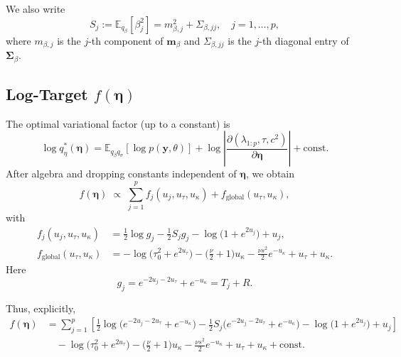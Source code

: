 \documentclass[11pt]{article}
\newcommand{\vect}[1]{\boldsymbol{#1}}
\newcommand{\mat}[1]{\mathbf{#1}}
\newcommand{\E}{\mathbb{E}}
\begin{document}
We also write
\begin{equation}
  S_j := \E_{q_\beta}[\beta_j^2]
       = m_{\beta,j}^2 + \Sigma_{\beta,jj},
  \quad j=1,\dots,p,
\end{equation}
where $m_{\beta,j}$ is the $j$-th component of $\vect{m}_\beta$ and $\Sigma_{\beta,jj}$ is the $j$-th diagonal entry of $\mat{\Sigma}_\beta$.

\subsection{Log-Target $f(\boldsymbol{\eta})$}

The optimal variational factor (up to a constant) is
\begin{equation}
  \log q_\eta^*(\vect{\eta})
  = \E_{q_\beta q_\sigma}[\log p(\vect{y},\theta)]
    + \log \left|\frac{\partial(\lambda_{1:p},\tau,c^2)}{\partial \vect{\eta}} \right|
    + \text{const}.
\end{equation}
After algebra and dropping constants independent of $\vect{\eta}$, we obtain
\begin{equation}
  f(\vect{\eta}) \;\propto\; \sum_{j=1}^p f_j(u_j,u_\tau,u_\kappa) 
  + f_{\mathrm{global}}(u_\tau,u_\kappa),
\end{equation}
with
\begin{align}
  f_j(u_j,u_\tau,u_\kappa)
  &=
  \frac12 \log g_j
  - \frac12 S_j g_j
  - \log\big(1+e^{2u_j}\big)
  + u_j, \label{eq:fj-def}\\[3pt]
  f_{\mathrm{global}}(u_\tau,u_\kappa)
  &=
  -\log\big(\tau_0^2 + e^{2u_\tau}\big)
  -\Big(\frac{\nu}{2}+1\Big)u_\kappa
  -\frac{\nu s^2}{2}e^{-u_\kappa}
  + u_\tau + u_\kappa. \label{eq:fglobal-def}
\end{align}
Here
\begin{equation}
  g_j 
  = e^{-2u_j-2u_\tau} + e^{-u_\kappa} 
  = T_j + R.
\end{equation}

Thus, explicitly,
\begin{align}
  f(\vect{\eta})
  &= \sum_{j=1}^p 
  \left[
    \frac12 \log\big(e^{-2u_j-2u_\tau} + e^{-u_\kappa}\big)
    - \frac12 S_j \big(e^{-2u_j-2u_\tau} + e^{-u_\kappa}\big)
    - \log\big(1+e^{2u_j}\big)
    + u_j
  \right] \nonumber\\
  &\quad -\log\big(\tau_0^2 + e^{2u_\tau}\big)
  -\Big(\frac{\nu}{2}+1\Big)u_\kappa
  -\frac{\nu s^2}{2}e^{-u_\kappa}
  + u_\tau + u_\kappa
  + \text{const}.
\end{align}
\end{document}

